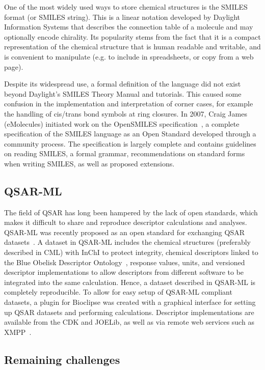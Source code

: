 \documentclass[10pt]{bmc_article}
\newenvironment{bmcformat}{\begin{raggedright}\baselineskip20pt\sloppy\setboolean{publ}{false}}{\end{raggedright}\baselineskip20pt\sloppy}
\begin{document}
\begin{bmcformat}
One of the most widely used ways to store chemical structures is the
SMILES format (or SMILES string). This is a linear notation developed
by Daylight Information Systems that describes the connection table
of a molecule and may optionally encode chirality. Its popularity
stems from the fact that it is a compact representation of the
chemical structure that is human readable and writable, and is
convenient to manipulate (e.g. to include in spreadsheets, or copy
from a web page).

Despite its widespread use, a formal
definition of the language did not exist beyond Daylight's SMILES
Theory Manual and tutorials. This caused some confusion in the
implementation and interpretation of corner cases, for example the
handling of cis/trans bond symbols at ring closures. In 2007, Craig
James (eMolecules) initiated work on the OpenSMILES specification~\cite{WebOpenSMILES}, a
complete specification of the SMILES language as an Open Standard
developed through a community process. The specification is largely
complete and contains guidelines on reading SMILES, a formal
grammar, recommendations on standard forms when writing SMILES, as
well as proposed extensions.

\subsection*{QSAR-ML}
The field of QSAR has long been hampered by the lack of open
standards, which makes it difficult to share and reproduce descriptor
calculations and analyses. QSAR-ML was recently proposed as an open
standard for exchanging QSAR datasets~\cite{Spjuth:2010uq}. A dataset
in QSAR-ML includes the chemical structures (preferably described in
CML) with InChI to protect integrity, chemical descriptors linked to
the Blue Obelisk Descriptor Ontology~\cite{bodo}, response values,
units, and versioned descriptor implementations to allow
descriptors from different software to be integrated into the same calculation.
Hence, a dataset described in QSAR-ML is completely reproducible. To
allow for easy setup of QSAR-ML compliant datasets, a plugin for
Bioclipse was created with a graphical interface for
setting up QSAR datasets and performing calculations. Descriptor
implementations are available from the CDK and JOELib, as well
as via remote web services such as XMPP~\cite{Wagener:2009uq}.

\subsection*{Remaining challenges}


\end{bmcformat}
\end{document}
